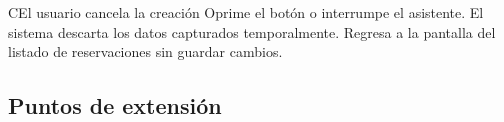 \begin{UCtrayectoriaA}{C}{El usuario cancela la creación}
    \UCpaso[\UCactor] Oprime el botón  o interrumpe el asistente.
    \UCpaso El sistema descarta los datos capturados temporalmente.
    \UCpaso Regresa a la pantalla del listado de reservaciones sin guardar cambios.
\end{UCtrayectoriaA}

\subsection{Puntos de extensión}

